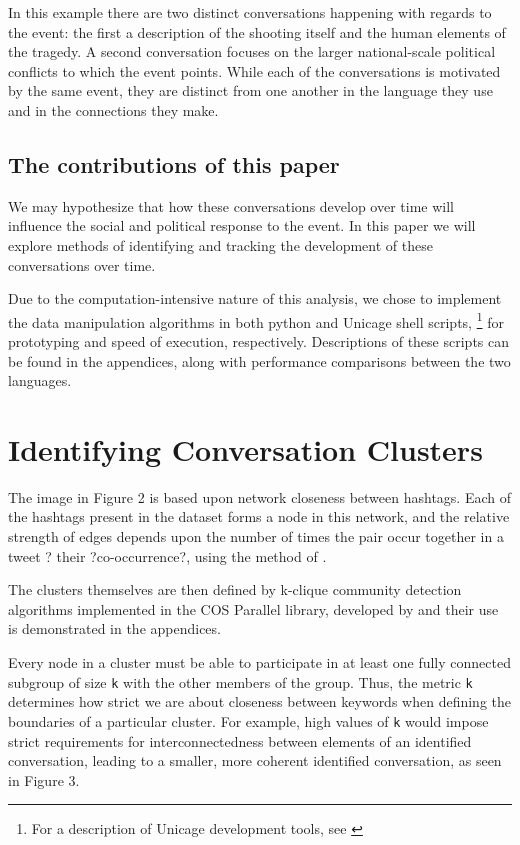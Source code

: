 \documentclass[12pt]{article}
\begin{document}
In this example there are two distinct conversations happening with regards to the event: the first a description of the shooting itself and the human elements of the tragedy. 
A second conversation focuses on the larger national-scale political conflicts to which the event points. 
While each of the conversations is motivated by the same event, they are distinct from one another in the language they use and in the connections they make.

\subsection{The contributions of this paper}
We may hypothesize that how these conversations develop over time will influence the social and political response to the event. 
In this paper we will explore methods of identifying and tracking the development of these conversations over time.

Due to the computation-intensive nature of this analysis, we chose to implement the data manipulation algorithms in both python and Unicage shell scripts, \footnote{For a description of Unicage development tools, see \cite{Tounaka2013}} for prototyping and speed of execution, respectively. 
Descriptions of these scripts can be found in the appendices, along with performance comparisons between the two languages.

\section{Identifying Conversation Clusters}
The image in Figure 2 is based upon network closeness between hashtags. Each of the hashtags present in the dataset forms a node in this network, and the relative strength of edges depends upon the number of times the pair occur together in a tweet ? their ?co-occurrence?, using the method of \cite{Marres}.

The clusters themselves are then defined by k-clique community detection algorithms implemented in the COS Parallel library, developed by \cite{Gregori2013} and their use is demonstrated in the appendices.

Every node in a cluster must be able to participate in at least one fully connected subgroup of size \texttt{k} with the other members of the group. Thus, the metric \texttt{k} determines how strict we are about closeness between keywords when defining the boundaries of a particular cluster. 
For example, high values of \texttt{k} would impose strict requirements for interconnectedness between elements of an identified conversation, leading to a smaller, more coherent identified conversation, as seen in Figure 3.
\end{document}

